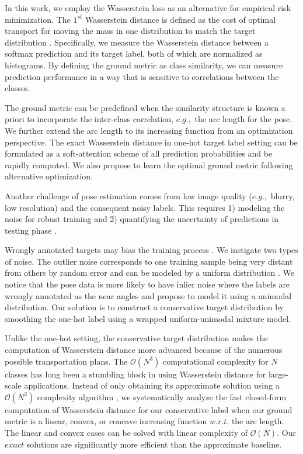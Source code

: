 In this work, we employ the Wasserstein loss as an alternative for empirical risk minimization. The $1^{st}$ Wasserstein distance is defined as the cost of optimal transport for moving the mass in one distribution to match the target distribution \cite{rubner2000earth,ruschendorf1985wasserstein}. Specifically, we measure the Wasserstein distance between a softmax prediction and its target label, both of which are normalized as histograms. By defining the ground metric as class similarity, we can measure prediction performance in a way that is sensitive to correlations between the classes. 




The ground metric can be predefined when the similarity structure is known a priori to incorporate the inter-class correlation, $e.g.,$ the arc length for the pose. We further extend the arc length to its increasing function from an optimization perspective. The exact Wasserstein distance in one-hot target label setting can be formulated as a soft-attention scheme of all prediction probabilities and be rapidly computed. We also propose to learn the optimal ground metric following alternative optimization.  

Another challenge of pose estimation comes from low image quality ($e.g.,$ blurry, low resolution) and the consequent noisy labels. This requires 1) modeling the noise for robust training \cite{liu2019unimodala,liu2019unimodalb} and 2) quantifying the uncertainty of predictions in testing phase \cite{prokudin2018deep}.


Wrongly annotated targets may bias the training process \cite{szegedy2016rethinking,belagiannis2015robust}. We instigate two types of noise. The outlier noise corresponds to one training sample being very distant from others by random error and can be modeled by a uniform distribution \cite{szegedy2016rethinking}. We notice that the pose data is more likely to have inlier noise where the labels are wrongly annotated as the near angles and propose to model it using a unimodal distribution. Our solution is to construct a conservative target distribution by smoothing the one-hot label using a wrapped uniform-unimodal mixture model.

Unlike the one-hot setting, the conservative target distribution makes the computation of Wasserstein distance more advanced because of the numerous possible transportation plans. The $\mathcal{O}(N^3)$ computational complexity for $N$ classes has long been a stumbling block in using Wasserstein distance for large-scale applications. Instead of only obtaining its approximate solution using a $\mathcal{O}(N^2)$ complexity algorithm  \cite{cuturi2013sinkhorn}, 
we systematically analyze the fast closed-form computation of Wasserstein distance for our conservative label when our ground metric is a linear, convex, or concave increasing function $w.r.t.$ the arc length. The linear and convex cases can be solved with linear complexity of $\mathcal{O}(N)$. Our $exact$ solutions are significantly more efficient than the approximate baseline. 






